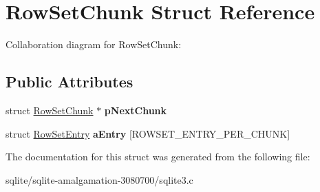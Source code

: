 \hypertarget{struct_row_set_chunk}{\section{Row\+Set\+Chunk Struct Reference}
\label{struct_row_set_chunk}
}


Collaboration diagram for Row\+Set\+Chunk\+:
\subsection*{Public Attributes}
\begin{DoxyCompactItemize}
\item 
\hypertarget{struct_row_set_chunk_ae8f0975c86633ae2bb8b212d3a767554}{struct \hyperlink{struct_row_set_chunk}{Row\+Set\+Chunk} $\ast$ {\bfseries p\+Next\+Chunk}}\label{struct_row_set_chunk_ae8f0975c86633ae2bb8b212d3a767554}

\item 
\hypertarget{struct_row_set_chunk_abde97bbb07c3bf9454e719ff860bdd1f}{struct \hyperlink{struct_row_set_entry}{Row\+Set\+Entry} {\bfseries a\+Entry} \mbox{[}R\+O\+W\+S\+E\+T\+\_\+\+E\+N\+T\+R\+Y\+\_\+\+P\+E\+R\+\_\+\+C\+H\+U\+N\+K\mbox{]}}\label{struct_row_set_chunk_abde97bbb07c3bf9454e719ff860bdd1f}

\end{DoxyCompactItemize}


The documentation for this struct was generated from the following file\+:\begin{DoxyCompactItemize}
\item 
sqlite/sqlite-\/amalgamation-\/3080700/sqlite3.\+c\end{DoxyCompactItemize}
